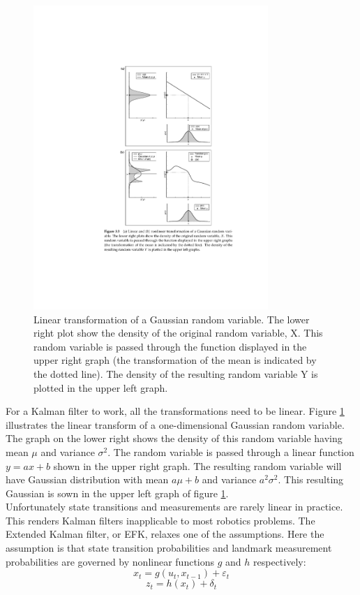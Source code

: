 \documentclass[conference]{IEEEtran}
\begin{document}
\begin{figure}[!t]
\centering
\includegraphics[width=3.5in]{./figures/KalmanXform.pdf}
\caption{Linear transformation of a Gaussian random variable. The lower right plot show the density of the original random variable, X. This random variable is passed through the function displayed in the upper right graph (the transformation of the mean is indicated by the dotted line). The density of the resulting random variable Y is plotted in the upper left graph.}
\label{KalmanXform}
\end{figure}

For a Kalman filter to work, all the transformations need to be linear. Figure \ref{KalmanXform} illustrates the linear transform of a one-dimensional Gaussian random variable. The graph on the lower right shows the density of this random variable having mean $\mu$ and variance $\sigma^2$. The random variable is passed through a linear function $y=ax+b$ shown in the upper right graph. The resulting random variable will have Gaussian distribution with mean $a\mu + b$ and variance $a^2\sigma^2$. This resulting Gaussian is sown in the upper left graph of figure \ref{KalmanXform}.\\

Unfortunately state transitions and measurements are rarely linear in practice\cite{thrun}. This renders Kalman filters inapplicable to most robotics problems. The Extended Kalman filter, or EFK, relaxes one of the assumptions. Here the assumption is that state transition probabilities and landmark measurement probabilities are governed by nonlinear functions $g$ and $h$ respectively:
\begin{equation}\label{transition}
x_{t} = g(u_{t}, x_{t-1}) + \varepsilon_{t}
\end{equation}
\begin{equation}\label{measurement}
z_{t} = h(x_{t}) + \delta_{t}
\end{equation}
\end{document}
